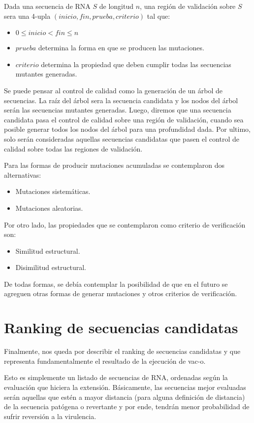 \begin{definition}
Dada una secuencia de \ac{RNA} $S$ de longitud $n$, una regi\'on de validaci\'on
sobre $S$ sera una 4-upla $(inicio, fin, prueba, criterio)$ tal que:
\begin{itemize}
 \item $0 \le inicio < fin \le n$
 \item $prueba$ determina la forma en que se producen las mutaciones.
 \item $criterio$ determina la propiedad que deben cumplir todas las secuencias
mutantes generadas.
\end{itemize}
\end{definition}

Se puede pensar al control de calidad como la generaci\'on de un \'arbol de
secuencias. La ra\'iz del \'arbol sera la secuencia candidata y los nodos del
\'arbol ser\'an las secuencias mutantes generadas. Luego, diremos que una
secuencia candidata pasa el control de calidad sobre una regi\'on de
validaci\'on, cuando sea posible generar todos los nodos del \'arbol para una
profundidad dada. Por ultimo, solo ser\'an consideradas aquellas secuencias
candidatas que pasen el control de calidad sobre todas las regiones de
validaci\'on.

Para las formas de producir mutaciones acumuladas se contemplaron dos
alternativas:
\begin{itemize}
 \item Mutaciones sistem\'aticas.
 \item Mutaciones aleatorias.
\end{itemize}

Por otro lado, las propiedades que se contemplaron como criterio de
verificaci\'on son:
\begin{itemize}
 \item Similitud estructural.
 \item Disimilitud estructural.
\end{itemize}

De todas formas, se deb\'ia contemplar la posibilidad de que en el
futuro se agreguen otras formas de generar mutaciones y otros criterios de
verificaci\'on.

\section{Ranking de secuencias candidatas}

Finalmente, nos queda por describir el ranking de secuencias candidatas y que
representa fundamentalmente el resultado de la ejecuci\'on de \ac{vac-o}.

Esto es simplemente un listado de secuencias de \ac{RNA}, ordenadas seg\'un la
evaluaci\'on que hiciera la extensi\'on. B\'asicamente, las secuencias mejor
evaluadas ser\'an aquellas que est\'en a mayor distancia (para alguna
definici\'on de distancia) de la secuencia pat\'ogena o revertante y por ende,
tendr\'an menor probabilidad de sufrir reversi\'on a la virulencia.
